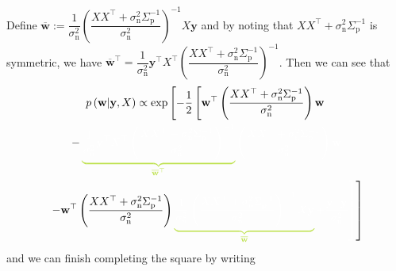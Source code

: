 \documentclass[11pt]{report} %
\begin{document}
Define $\overline{\mathbf{w}} := \dfrac{1}{\sigma_{\mathrm{n}}^{2}}\left(\dfrac{XX^{\top}+\sigma_{\mathrm{n}}^{2}\Sigma_{\mathrm{p}}^{-1}}{\sigma_{\mathrm{n}}^{2}}\right)^{-1}X\mathbf{y}$ and by noting that $XX^{\top}+\sigma_{\mathrm{n}}^{2}\Sigma_{\mathrm{p}}^{-1}$ is symmetric, we have $\overline{\mathbf{w}}^{\top}=\dfrac{1}{\sigma_{\mathrm{n}}^{2}}\mathbf{y}^{\top}X^{\top}\left(\dfrac{XX^{\top}+\sigma_{\mathrm{n}}^{2}\Sigma_{\mathrm{p}}^{-1}}{\sigma_{\mathrm{n}}^{2}}\right)^{-1}$. Then we can see that
\begin{multline}
p\left(\mathbf{w}\middle|\mathbf{y},X\right) \propto \exp\left[-\dfrac{1}{2}\left[\mathbf{w}^{\top}\left(\dfrac{XX^{\top}+\sigma_{\mathrm{n}}^{2}\Sigma_{\mathrm{p}}^{-1}}{\sigma_{\mathrm{n}}^{2}}\right)\mathbf{w}\right.\right. \\
-\green\underbrace{\black\dfrac{1}{\sigma_{\mathrm{n}}^{2}}\mathbf{y}^{\top}X^{\top}\left(\dfrac{XX^{\top}+\sigma_{\mathrm{n}}^{2}\Sigma_{\mathrm{p}}^{-1}}{\sigma_{\mathrm{n}}^{2}}\right)^{-1}}_{\green \overline{\mathbf{w}}^{\top}}\black\left(\dfrac{XX^{\top}+\sigma_{\mathrm{n}}^{2}\Sigma_{\mathrm{p}}^{-1}}{\sigma_{\mathrm{n}}^{2}}\right)\mathbf{w} \\ 
\left.\left.-\mathbf{w}^{\top}\left(\dfrac{XX^{\top}+\sigma_{\mathrm{n}}^{2}\Sigma_{\mathrm{p}}^{-1}}{\sigma_{\mathrm{n}}^{2}}\right)\green\underbrace{\black \dfrac{1}{\sigma_{\mathrm{n}}^{2}}\left(\dfrac{XX^{\top}+\sigma_{\mathrm{n}}^{2}\Sigma_{\mathrm{p}}^{-1}}{\sigma_{\mathrm{n}}^{2}}\right)^{-1} X\mathbf{y}}_{\green \overline{\mathbf{w}}}\black +\dfrac{\mathbf{y}^{\top}\mathbf{y}}{\sigma_{\mathrm{n}}^{2}}\right]\right]
\end{multline}
and we can finish completing the square by writing
\end{document}
